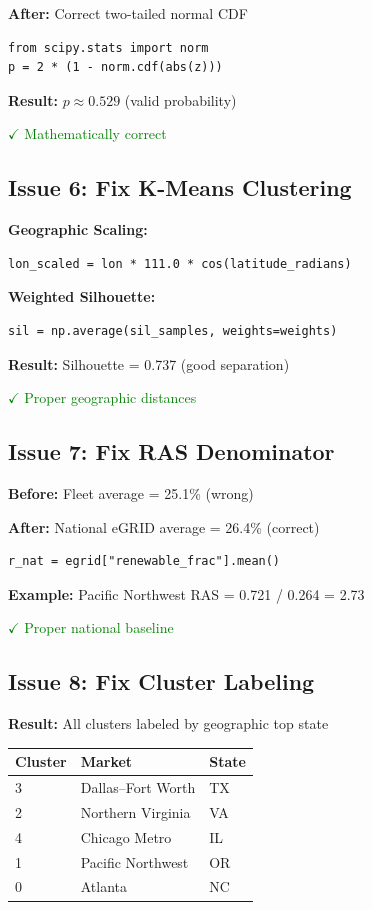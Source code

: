 \documentclass[11pt,a4paper]{article}
\begin{document}
\textbf{After:} Correct two-tailed normal CDF
\begin{verbatim}
from scipy.stats import norm
p = 2 * (1 - norm.cdf(abs(z)))
\end{verbatim}

\textbf{Result:} $p \approx 0.529$ (valid probability)

\textcolor{green}{$\checkmark$ Mathematically correct}

\subsection{Issue 6: Fix K-Means Clustering}

\textbf{Geographic Scaling:}
\begin{verbatim}
lon_scaled = lon * 111.0 * cos(latitude_radians)
\end{verbatim}

\textbf{Weighted Silhouette:}
\begin{verbatim}
sil = np.average(sil_samples, weights=weights)
\end{verbatim}

\textbf{Result:} Silhouette = 0.737 (good separation)

\textcolor{green}{$\checkmark$ Proper geographic distances}

\subsection{Issue 7: Fix RAS Denominator}

\textbf{Before:} Fleet average = 25.1\% (wrong)

\textbf{After:} National eGRID average = 26.4\% (correct)

\begin{verbatim}
r_nat = egrid["renewable_frac"].mean()
\end{verbatim}

\textbf{Example:} Pacific Northwest RAS = 0.721 / 0.264 = 2.73

\textcolor{green}{$\checkmark$ Proper national baseline}

\subsection{Issue 8: Fix Cluster Labeling}

\textbf{Result:} All clusters labeled by geographic top state

\begin{center}
\begin{tabular}{lll}
\toprule
\textbf{Cluster} & \textbf{Market} & \textbf{State} \\
\midrule
3 & Dallas--Fort Worth & TX \\
2 & Northern Virginia & VA \\
4 & Chicago Metro & IL \\
1 & Pacific Northwest & OR \\
0 & Atlanta & NC \\
\bottomrule
\end{tabular}
\end{center}
\end{document}
